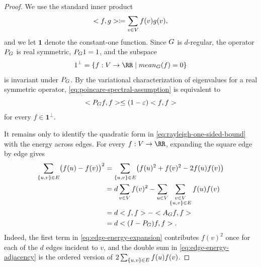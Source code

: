 \begin{proof}
	We use the standard inner product
	\begin{equation}
		\label{eq:uniform-inner-product}
		< f,g>\coloneqq \sum_{v\in V}f(v)g(v),
	\end{equation}
	and we let \(\mathbf{1}\) denote the constant-one function. Since \(G\) is \(d\)-regular, the operator \(P_{G}\) is real symmetric, \(P_{G}1=1\), and the subspace
	\begin{equation}
		\label{eq:mean-zero-subspace}
		\mathbf{1}^{\perp}=\{f:\Vertices\to\RR\mid \GraphMean{f}=0\}
	\end{equation}
	is invariant under \(P_{G}\). By the variational characterization of eigenvalues for a real symmetric operator, \cref{eq:poincare-spectral-assumption} is equivalent to
	\begin{equation}
		\label{eq:rayleigh-one-sided-bound}
		< P_{G}f,f>\leq (1-\varepsilon)< f,f>
	\end{equation}
	for every \(f\in\mathbf{1}^{\perp}\).

	It remains only to identify the quadratic form in \cref{eq:rayleigh-one-sided-bound} with the energy across edges. For every \(f:\Vertices\to\RR\), expanding the square edge by edge gives
	\begin{align}
		\sum_{\{u,v\}\in E}\bigl(f(u)-f(v)\bigr)^2
		 & =\sum_{\{u,v\}\in E}\bigl(f(u)^2+f(v)^2-2f(u)f(v)\bigr) \label{eq:edge-energy-expansion}                                                 \\
		 & =d\sum_{v\in V}f(v)^2-\sum_{u\in V}\sum_{\substack{v\in V\\ \{u,v\}\in E}}f(u)f(v) \label{eq:edge-energy-adjacency} \\
		 & =d< f,f>-< A_{G}f,f> \label{eq:edge-energy-operator}                                                    \\
		 & =d< (I-P_{G})f,f> . \label{eq:edge-energy-markov}
	\end{align}
	Indeed, the first term in \cref{eq:edge-energy-expansion} contributes \(f(v)^2\) once for each of the \(d\) edges incident to \(v\), and the double sum in \cref{eq:edge-energy-adjacency} is the ordered version of \(2\sum_{\{u,v\}\in E}f(u)f(v)\).


\end{proof}
